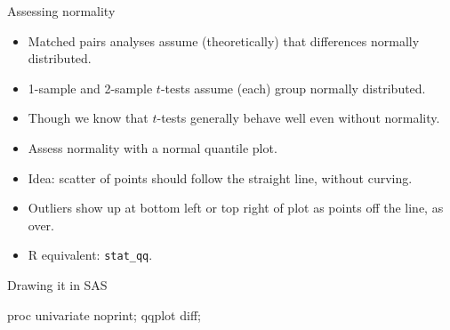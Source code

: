 \documentclass[unknownkeysallowed]{beamer}\usepackage[]{graphicx}\usepackage[]{color}
\begin{document}
\begin{frame}[fragile]{Assessing normality}

  \begin{itemize}
  \item Matched pairs analyses assume (theoretically) that differences normally
distributed. 
\item 1-sample and 2-sample $t$-tests assume (each) group normally distributed.
\item Though we know that $t$-tests generally behave well even
without normality. 
\item Assess normality with a  normal quantile plot.
\item Idea: scatter of points should follow the straight line, without curving.
\item Outliers show up at bottom left or top right of plot as points
  off the line, as over.
  
\item R equivalent: \texttt{stat\_qq}.
  \end{itemize}


  
\end{frame}





\begin{frame}[fragile]{Drawing it in SAS}

\begin{Sascode}[store=ie]
  proc univariate noprint;
    qqplot diff;
\end{Sascode}


  
\end{frame}
\end{document}
